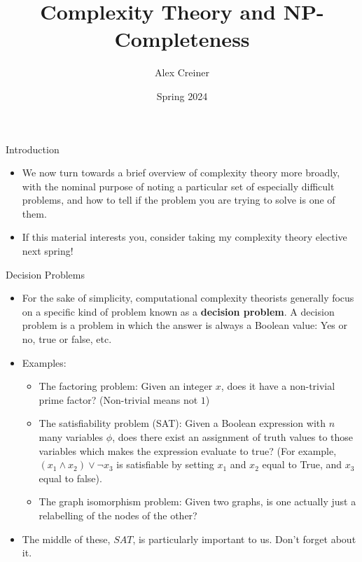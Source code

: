 \documentclass{beamer}
\title{Complexity Theory and NP-Completeness}
\author{Alex Creiner}
\institute{Boston College}
\date{Spring 2024}
\begin{document}
\titlepage
\begin{frame}{Introduction}
    \begin{itemize}
        \item We now turn towards a brief overview of complexity theory more broadly, with the nominal purpose of noting a particular set of especially difficult problems, and how to tell if the problem you are trying to solve is one of them. 
        \item If this material interests you, consider taking my complexity theory elective next spring! 
    \end{itemize}
\end{frame}

\begin{frame}{Decision Problems}
    \begin{itemize}
        \item For the sake of simplicity, computational complexity theorists generally focus on a specific kind of problem known as a \textbf{decision problem}. A decision problem is a problem in which the answer is always a Boolean value: Yes or no, true or false, etc. \pause 
        \item Examples:
        \begin{itemize}
            \item The factoring problem: Given an integer $x$, does it have a non-trivial prime factor? (Non-trivial means not $1$) \pause 
            \item The satisfiability problem (SAT): Given a Boolean expression with $n$ many variables $\phi$, does there exist an assignment of truth values to those variables which makes the expression evaluate to true? (For example, $(x_1 \wedge x_2)\vee \neg x_3$ is satisfiable by setting $x_1$ and $x_2$ equal to True, and $x_3$ equal to false). \pause
            \item The graph isomorphism problem: Given two graphs, is one actually just a relabelling of the nodes of the other? \pause 
        \end{itemize}
        \item The middle of these, $SAT$, is particularly important to us. Don't forget about it. 
    \end{itemize}
\end{frame}
\end{document}
